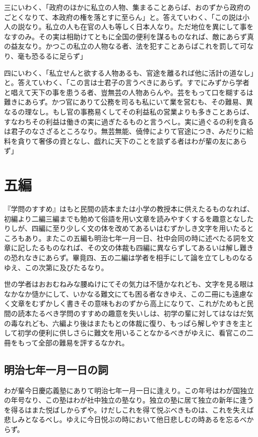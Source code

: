 \documentclass[a4paper, platex, dvipdfmx]{jsarticle}
\begin{document}
三にいわく、「政府のほかに私立の人物、集まることあらば、おのずから政府のごとくなりて、本政府の権を落とすに至らん」と。答えていわく、「この説は小人の説なり。私立の人も在官の人も等しく日本人なり。ただ地位を異にして事をなすのみ。その実は相助けてともに全国の便利を謀るものなれば、敵にあらず真の益友なり。かつこの私立の人物なる者、法を犯すことあらばこれを罰して可なり、毫も恐るるに足らず」

四にいわく、「私立せんと欲する人物あるも、官途を離るれば他に活計の道なし」と。答えていわく、「この言は士君子の言うべきにあらず。すでにみずから学者と唱えて天下の事を患うる者、豈無芸の人物あらんや。芸をもって口を糊するは難きにあらず。かつ官にありて公務を司るも私にいて業を営むも、その難易、異なるの理なし。もし官の事務易くしてその利益私の営業よりも多きことあらば、すなわちその利益は働きの実に過ぎたるものと言うべし。実に過ぐるの利を貪るは君子のなさざるところなり。無芸無能、僥倖によりて官途につき、みだりに給料を貪りて奢侈の資となし、戯れに天下のことを談ずる者はわが輩の友にあらず」

\section{五編}
『学問のすすめ』はもと民間の読本または小学の教授本に供えたるものなれば、初編より二編三編までも勉めて俗語を用い文章を読みやすくするを趣意となしたりしが、四編に至り少しく文の体を改めてあるいはむずかしき文字を用いたるところもあり。またこの五編も明治七年一月一日、社中会同の時に述べたる詞を文章に記したるものなれば、その文の体裁も四編に異ならずしてあるいは解し難きの恐れなきにあらず。畢竟四、五の二編は学者を相手にして論を立てしものなるゆえ、この次第に及びたるなり。

世の学者はおおむねみな腰ぬけにてその気力は不慥かなれども、文字を見る眼はなかなか慥かにして、いかなる難文にても困る者なきゆえ、この二冊にも遠慮なく文章をむずかしく書きその意味もおのずから高上になりて、これがためもと民間の読本たるべき学問のすすめの趣意を失いしは、初学の輩に対してはなはだ気の毒なれども、六編より後はまたもとの体裁に復り、もっぱら解しやすきを主として初学の便利に供しさらに難文を用いることなかるべきがゆえに、看官この二冊をもって全部の難易を評するなかれ。

\subsection{明治七年一月一日の詞}
わが輩今日慶応義塾にありて明治七年一月一日に逢えり。この年号はわが国独立の年号なり、この塾はわが社中独立の塾なり。独立の塾に居て独立の新年に逢うを得るはまた悦ばしからずや。けだしこれを得て悦ぶべきものは、これを失えば悲しみとなるべし。ゆえに今日悦ぶの時において他日悲しむの時あるを忘るべからず。
\end{document}
